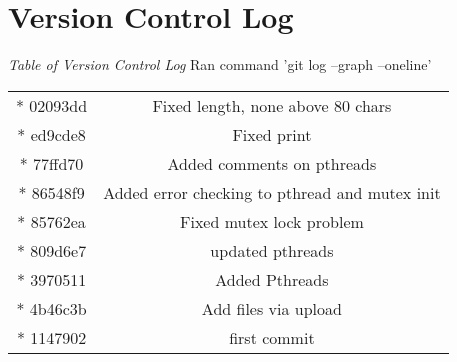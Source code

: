 \documentclass{article}
\begin{document}
\section*{Version Control Log}
\textit{Table of Version Control Log} Ran command 'git log --graph --oneline'
\newline 
\begin{center}
\begin{tabular}{ c c }
 * 02093dd & Fixed length, none above 80 chars \\ 
 * ed9cde8 & Fixed print \\  
 * 77ffd70 & Added comments on pthreads \\ 
 * 86548f9 & Added error checking to pthread and mutex init \\  
 * 85762ea & Fixed mutex lock problem \\ 
 * 809d6e7 & updated pthreads \\ 
 * 3970511 & Added Pthreads \\ 
 * 4b46c3b & Add files via upload \\   
 * 1147902 & first commit    
\end{tabular}
\end{center}

\end{document}
